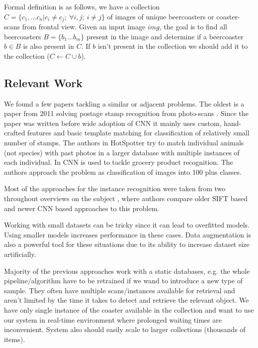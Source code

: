 \documentclass{article}
\begin{document}
Formal definition is as follows, we have a collection $C=\{c_1,...c_n | c_i \neq c_j;\ \forall i,j;\ i \neq j\}$ of images of unique beercoasters or coaster-scans from frontal view.
Given an input image $img$, the goal is to find all beercoasters $B=\{b_1...b_m\}$ present in the image 
and determine if a beercoaster $b \in B$ is also present in $C$. 
If $b$ isn't present in the collection we should add it to the collection ($C \leftarrow C \cup b$).

\subsection{Relevant Work}
We found a few papers tackling a similar or adjacent problems.
The oldest is a paper from 2011 solving postage stamp recognition from photo-scans \cite{}.
Since the paper was written before wide adoption of CNN it mainly uses custom, hand-crafted features and basic template matching for classification of relatively small number of stamps.
The authors in HotSpotter \cite{} try to match individual animals (not species) with past photos in a larger database with multiple instances of each individual.
In \cite{} CNN is used to tackle grocery product recognition. The authors approach the problem as classification of images into 100 plus classes.

Most of the approaches for the instance recognition were taken from two throughout overviews on the subject \cite{} \cite{},
where authors compare older SIFT based and newer CNN based approaches to this problem.

Working with small datasets can be tricky since it can lead to overfitted models. Using smaller models increases performance in these cases.\cite{} Data augmentation is also a powerful tool for these situations due to its ability to 
increase dataset size artificially. \cite{}


Majority of the previous approaches work with a static databases, e.g. the whole pipeline/algorithm have to be retrained if we wand to introduce a new type of sample.
They often have multiple scans/instances available for retrieval and aren't limited by the time it takes to detect and retrieve the relevant object.
We have only single instance of the coaster available in the collection and want to use our system in real-time environment where prolonged waiting times are inconvenient.
System also should easily scale to larger collections (thousands of items).
\end{document}
